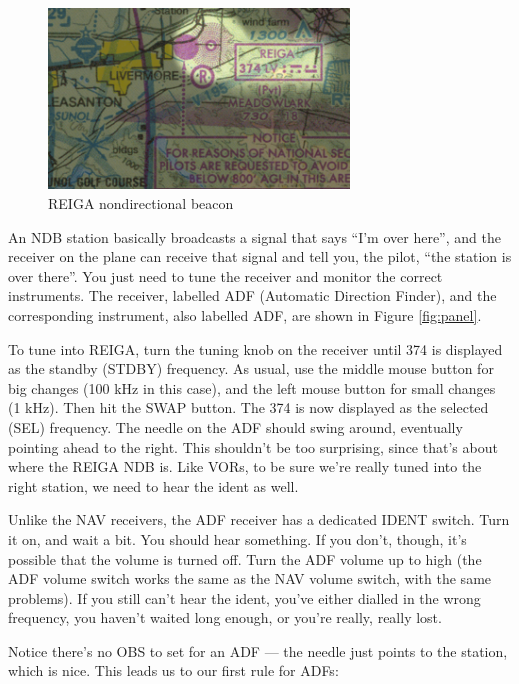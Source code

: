 
\begin{figure}
  \begin{center}
    \includegraphics[width=8cm]{img/NDB}
    \caption{REIGA nondirectional beacon}
    \label{fig:NDB}
  \end{center}
\end{figure}

An NDB station basically broadcasts a signal that says ``I'm over
here'', and the receiver on the plane can receive that signal and tell
you, the pilot, ``the station is over there''.  You just need to tune
the receiver and monitor the correct instruments.  The receiver,
labelled ADF (Automatic Direction Finder), and the corresponding
instrument, also labelled ADF, are shown in Figure \ref{fig:panel}.

To tune into REIGA, turn the tuning knob on the receiver until 374 is
displayed as the standby (STDBY) frequency.  As usual, use the middle
mouse button for big changes (100 kHz in this case), and the left
mouse button for small changes (1 kHz).  Then hit the SWAP button.
The 374 is now displayed as the selected (SEL) frequency.  The needle
on the ADF should swing around, eventually pointing ahead to the
right.  This shouldn't be too surprising, since that's about where the
REIGA NDB is.  Like VORs, to be sure we're really tuned into the right
station, we need to hear the ident as well.

Unlike the NAV receivers, the ADF receiver has a dedicated IDENT
switch.  Turn it on, and wait a bit.  You should hear something.  If
you don't, though, it's possible that the volume is turned off.  Turn
the ADF volume up to high (the ADF volume switch works the same as the
NAV volume switch, with the same problems).  If you still can't hear
the ident, you've either dialled in the wrong frequency, you haven't
waited long enough, or you're really, really lost.

Notice there's no OBS to set for an ADF --- the needle just points to
the station, which is nice.  This leads us to our first rule for ADFs:

